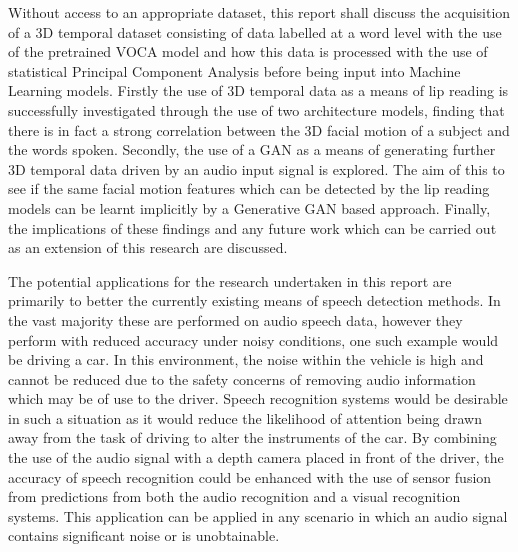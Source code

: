 Without access to an appropriate dataset, this report shall discuss the acquisition of a 3D temporal dataset consisting of data labelled at a word level with the use of the pretrained VOCA model \cite{Cudeiro2019} and how this data is processed with the use of statistical Principal Component Analysis before being input into Machine Learning models.
Firstly the use of 3D temporal data as a means of lip reading is successfully investigated through the use of two architecture models, finding that there is in fact a strong correlation between the 3D facial motion of a subject and the words spoken.
Secondly, the use of a GAN as a means of generating further 3D temporal data driven by an audio input signal is explored.
The aim of this to see if the same facial motion features which can be detected by the lip reading models can be learnt implicitly by a Generative GAN based approach.
Finally, the implications of these findings and any future work which can be carried out as an extension of this research are discussed.

The potential applications for the research undertaken in this report are primarily to better the currently existing means of speech detection methods.
In the vast majority these are performed on audio speech data, however they perform with reduced accuracy under noisy conditions, one such example would be driving a car.
In this environment, the noise within the vehicle is high and cannot be reduced due to the safety concerns of removing audio information which may be of use to the driver.
Speech recognition systems would be desirable in such a situation as it would reduce the likelihood of attention being drawn away from the task of driving to alter the instruments of the car.
By combining the use of the audio signal with a depth camera placed in front of the driver, the accuracy of speech recognition could be enhanced with the use of sensor fusion from predictions from both the audio recognition and a visual recognition systems.
This application can be applied in any scenario in which an audio signal contains significant noise or is unobtainable.